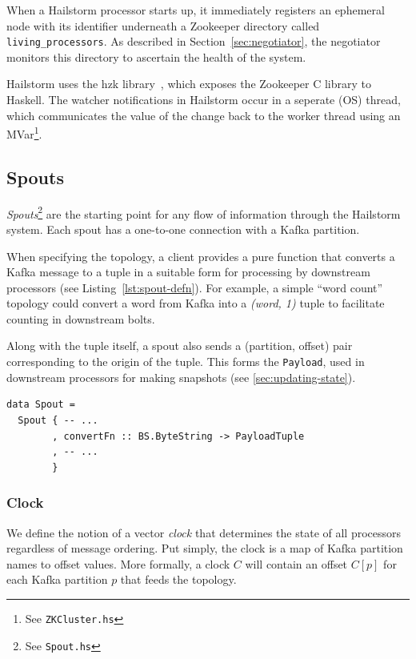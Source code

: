\documentclass[10pt,nocopyrightspace]{sigplanconf}
\begin{document}
When a Hailstorm processor starts up, it immediately registers an ephemeral node
with its identifier underneath a Zookeeper directory called
\lstinline{living_processors}. As described in Section~\ref{sec:negotiator}, the
negotiator monitors this directory to ascertain the health of the system.

Hailstorm uses the hzk library~\cite{hzk}, which exposes the
Zookeeper C library to Haskell. The watcher notifications in Hailstorm occur in
a seperate (OS) thread, which communicates the value of the change
back to the worker thread using an MVar\footnote{See \texttt{ZKCluster.hs}}.

\subsection{Spouts}

\textit{Spouts}\footnote{See \texttt{Spout.hs}} are the starting point for any
flow of information through the Hailstorm system. Each spout has a one-to-one
connection with a Kafka partition.

When specifying the topology, a client provides a pure function that converts a
Kafka message to a tuple in a suitable form for processing by downstream
processors (see Listing~\ref{lst:spout-defn}).  For example, a simple ``word
count'' topology could convert a word from Kafka into a \textit{(word, 1)}
tuple to facilitate counting in downstream bolts.

Along with the tuple itself, a spout also sends a (partition, offset) pair
corresponding to the origin of the tuple. This forms the \texttt{Payload}, 
used in downstream processors for making snapshots (see \ref{sec:updating-state}).

\begin{lstlisting}[caption=Client interface for a
spout,label=lst:spout-defn,float]
data Spout =
  Spout { -- ...
        , convertFn :: BS.ByteString -> PayloadTuple
        , -- ...
        }
\end{lstlisting}

\subsubsection{Clock}
\label{sec:clock}

We define the notion of a vector \textit{clock} that determines the 
state of all processors regardless of message ordering.  Put
simply, the clock is a map of Kafka partition names to offset values.
More formally, a clock $C$ will contain an offset
$C[p]$ for each Kafka partition $p$ that feeds the topology.
\end{document}
